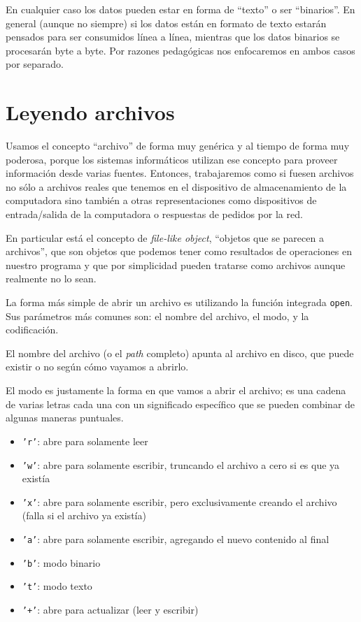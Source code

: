 En cualquier caso los datos pueden estar en forma de ``texto'' o ser ``binarios''. En general (aunque no siempre) si los datos están en formato de texto estarán pensados para ser consumidos línea a línea, mientras que los datos binarios se procesarán byte a byte. Por razones pedagógicas nos enfocaremos en ambos casos por separado.


\section{Leyendo archivos}\label{sec:archivos}

Usamos el concepto ``archivo'' de forma muy genérica y al tiempo de forma muy poderosa, porque los sistemas informáticos utilizan ese concepto para proveer información desde varias fuentes. Entonces, trabajaremos como si fuesen archivos no sólo a archivos reales que tenemos en el dispositivo de almacenamiento de la computadora sino también a otras representaciones como dispositivos de entrada/salida de la computadora o respuestas de pedidos por la red.

En particular está el concepto de \textit{file-like object}, ``objetos que se parecen a archivos'', que son objetos que podemos tener como resultados de operaciones en nuestro programa y que por simplicidad pueden tratarse como archivos aunque realmente no lo sean.

La forma más simple de abrir un archivo es utilizando la función integrada \texttt{open}. Sus parámetros más comunes son: el nombre del archivo, el modo, y la codificación.

El nombre del archivo (o el \textit{path} completo) apunta al archivo en disco, que puede existir o no según cómo vayamos a abrirlo.

El modo es justamente la forma en que vamos a abrir el archivo; es una cadena de varias letras cada una con un significado específico que se pueden combinar de algunas maneras puntuales.

\begin{itemize}
    \item \texttt{'r'}: abre para solamente leer
    \item \texttt{'w'}: abre para solamente escribir, truncando el archivo a cero si es que ya existía
    \item \texttt{'x'}: abre para solamente escribir, pero exclusivamente creando el archivo (falla si el archivo ya existía)
    \item \texttt{'a'}: abre para solamente escribir, agregando el nuevo contenido al final
    \item \texttt{'b'}: modo binario
    \item \texttt{'t'}: modo texto
    \item \texttt{'+'}: abre para actualizar (leer y escribir)
\end{itemize}

